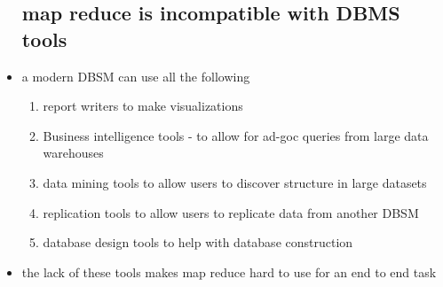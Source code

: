 \documentclass{article}
\begin{document}
\begin{itemize}
\subsection*{map reduce is incompatible with DBMS tools}
\item a modern DBSM can use all the following
\begin{enumerate}
    \item report writers to make visualizations 
    \item Business intelligence tools - to allow for ad-goc queries from large data warehouses
    \item data mining tools to allow users to discover structure in large datasets 
    \item replication tools to allow users to replicate data from another DBSM
    \item database design tools to help with database construction 
\end{enumerate}
\item the lack of these tools makes map reduce hard to use for an end to end task 
\end{itemize}
\end{document}
